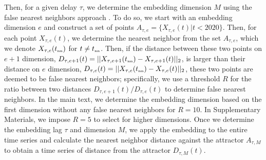 \documentclass[12pt]{article}
\newcommand{\tsub}[2]{#1_{{\textrm{\tiny #2}}}}
\begin{document}
Then, for a given delay $\tau$, we determine the embedding dimension $M$ using the false nearest neighbors approach \citep{kennel1992determining,tan2023selecting}.
To do so, we start with an embedding dimension $e$ and construct a set of points $A_{\tau,e}= \{X_{\tau,e}(t) | t < 2020\}$.
Then, for each point $X_{\tau,e}(t)$, we determine the nearest neighbor from the set $A_{\tau,e}$, which we denote $X_{\tau,e}(\tsub{t}{nn})$ for $t \neq \tsub{t}{nn}$.
Then, if the distance between these two points on $e+1$ dimension, $D_{\tau,e+1}(t) = ||X_{\tau,e+1}(\tsub{t}{nn})-X_{\tau,e+1}(t)||_2$, is larger than their distance on $e$ dimension, $D_{\tau,e}(t) = ||X_{\tau,e}(\tsub{t}{nn})-X_{\tau,e}(t)||_2$, these two points are deemed to be false nearest neighbors;
specifically, we use a threshold $R$ for the ratio between two distances $D_{\tau,e+1}(t)/D_{\tau,e}(t)$ to determine false nearest neighbors.
In the main text, we determine the embedding dimension based on the first dimension without any false nearest neighbors for $R=10$.
In Supplementary Materials, we impose $R=5$ to select for higher dimensions.
Once we determine the embedding lag $\tau$ and dimension $M$, we apply the embedding to the entire time series and calculate the nearest neighbor distance against the attractor $A_{\tau,M}$ to obtain a time series of distance from the attractor $D_{\tau,M}(t)$.
\end{document}
